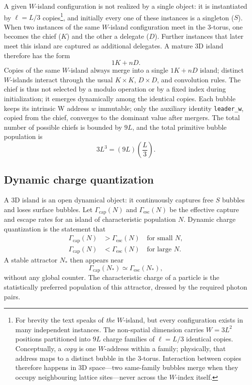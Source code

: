 \documentclass{ijuc}
\begin{document}
A given $W$-island configuration is not realized by a single object: it is instantiated by $\ell=L/3$ copies\footnote{For brevity the text speaks of \emph{the} $W$-island, but every configuration exists in many independent instances. The non-spatial dimension carries $W=3L^2$ positions partitioned into $9L$ charge families of $\ell=L/3$ identical copies.  Conceptually, a \emph{copy} is one $W$-address within a family; physically, that address maps to a distinct bubble in the 3-torus.  Interaction between copies therefore happens in 3D space---two same-family bubbles merge when they occupy neighbouring lattice sites---never across the $W$-index itself.}, and initially every one of these instances is a singleton ($S$). When two instances of the same $W$-island configuration meet in the 3-torus, one becomes the chief ($K$) and the other a delegate ($D$). Further instances that later meet this island are captured as additional delegates. A mature 3D island therefore has the form
\begin{equation}
1K + nD.
\end{equation}
Copies of the same $W$-island always merge into a single $1K+nD$ island; distinct $W$-islands interact through the usual $K\times K$, $D\times D$, and convolution rules. The chief is thus not selected by a modulo operation or by a fixed index during initialization; it emerges dynamically among the identical copies. Each bubble keeps its intrinsic W address $w$ immutable; only the auxiliary identity \texttt{leader\_w}, copied from the chief, converges to the dominant value after mergers. The total number of possible chiefs is bounded by $9L$, and the total primitive bubble population is
\begin{equation}
3L^3 = (9L)\left(\frac{L}{3}\right).
\end{equation}

\subsection{Dynamic charge quantization}

A 3D island is an open dynamical object: it continuously captures free $S$ bubbles and loses surface bubbles. Let $\Gamma_{\mathrm{cap}}(N)$ and $\Gamma_{\mathrm{esc}}(N)$ be the effective capture and escape rates for an island of characteristic population $N$. Dynamic charge quantization is the statement that
\begin{align}
\Gamma_{\mathrm{cap}}(N) &> \Gamma_{\mathrm{esc}}(N) \quad \text{for small } N, \\
\Gamma_{\mathrm{cap}}(N) &< \Gamma_{\mathrm{esc}}(N) \quad \text{for large } N.
\end{align}
A stable attractor $N_*$ then appears near
\begin{equation}
\Gamma_{\mathrm{cap}}(N_*) \simeq \Gamma_{\mathrm{esc}}(N_*),
\end{equation}
without any global counter. The characteristic charge of a particle is the statistically preferred population of this attractor, dressed by the required photon pairs.
\end{document}
